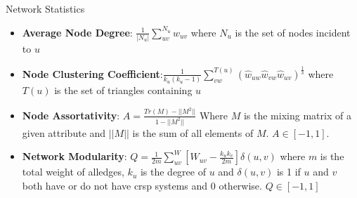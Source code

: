 \documentclass[dvipsnames]{beamer}
\begin{document}
\begin{frame}[fragile]{Network Statistics}
    \begin{itemize}
        \item<2-> \textbf{Average Node Degree}: $\frac{1}{|N_u|}\sum_{uv}^{N_u} w_{uv}$ where $N_u$ is the set of nodes incident to $u$
        \item<3-> \textbf{Node Clustering Coefficient}:$\frac{1}{k_u(k_u-1)} \sum_{vw}^{T(u)} (\hat{w}_{uw} \hat{w}_{vw} \hat{w}_{uv})^{\frac{1}{3}}$ where $T(u)$ is the set of triangles containing $u$ \autocite{clustering}
        \item<4-> \textbf{Node Assortativity}: $A = \frac{Tr(M)-||M^2||}{1-||M^2||}$ Where $M$ is the mixing matrix of a given attribute and $||M||$ is the sum of all elements of $M$. $A \in [-1,1]$. \autocite{newmanmix}
        \item<5-> \textbf{Network Modularity}: $Q=\frac{1}{2m}\sum_{uv}^W [W_{uv} - \frac{k_u k_v}{2m}]\delta(u,v)$ where $m$ is the total weight of alledges, $k_u$ is the degree of $u$ and $\delta(u,v)$ is 1 if $u$ and $v$ both have or do not have \ac{crsp} systems and 0 otherwise. $Q \in [-1,1]$ \autocite{modularity}
    \end{itemize}
\end{frame}
\end{document}
